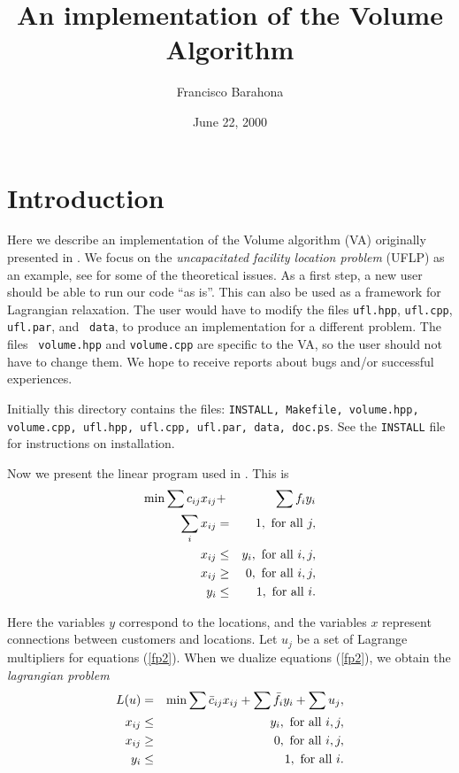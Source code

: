 \documentclass{article}
\begin{document}


\title{\bf An implementation of the Volume Algorithm}
\author{Francisco Barahona}
\date{June 22, 2000}
\maketitle

\section{Introduction}

Here we describe an implementation of the Volume algorithm (VA) originally
presented in \cite{BA}. We focus on the {\it uncapacitated facility location
problem} (UFLP) as an example, see \cite{BC} for some of the theoretical
issues. As a first step, a new user should be able to run our code ``as is''.
This can also be used as a framework for Lagrangian relaxation. The user would
have to modify the files {\tt ufl.hpp}, {\tt ufl.cpp}, {\tt ufl.par}, and {\tt
data}, to produce an implementation for a different problem. The files {\tt
volume.hpp} and {\tt volume.cpp} are specific to the VA, so the user should
not have to change them. We hope to receive reports about bugs and/or
successful experiences.

\smallskip

Initially this directory contains the files: {\tt INSTALL, Makefile,
  volume.hpp, volume.cpp, ufl.hpp, ufl.cpp, ufl.par, data, doc.ps}. See the
  {\tt INSTALL} file for instructions on installation.

Now we present the linear program used in \cite{BC}. This is
\begin{eqnarray}
\min \sum c_{ij} x_{ij} & + & \sum f_i y_i  \label{fp1} \\
\sum_i x_{ij} & = & 1, \hbox{ for all } j,  \label{fp2} \\
x_{ij} & \leq & y_i, \hbox{ for all } i, j, \label{fp3} \\
x_{ij} & \ge  & 0, \hbox{ for all } i, j,   \label{fp4} \\ 
y_i    & \le  & 1, \hbox{ for all } i.      \label{fp5}
\end{eqnarray}

Here the variables $y$ correspond to the locations, and the variables $x$
represent connections between customers and locations. Let $u_j$ be a set of
Lagrange multipliers for equations (\ref{fp2}). When we dualize equations
(\ref{fp2}), we obtain the {\it lagrangian problem}
\begin{eqnarray*}
L(u) & = & \min \sum \bar c_{ij} x_{ij} + \sum \bar f_i y_i + \sum u_j, \\
x_{ij} & \le & y_i, \hbox{ for all } i, j, \\
x_{ij} & \ge & 0, \hbox{ for all } i, j, \\
y_i    & \le & 1, \hbox{ for all } i.
\end{eqnarray*}
\end{document}

